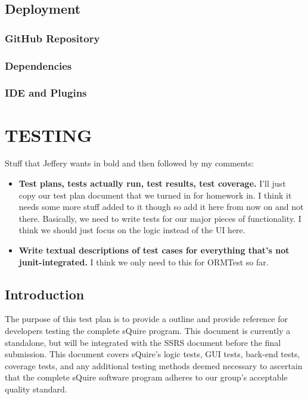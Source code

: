 \documentclass[twoside,letterpaper]{article}
\begin{document}
\newpage
\subsection{Deployment}

\subsubsection{GitHub Repository}



\newpage
\subsubsection{Dependencies}


\newpage
\subsubsection{IDE and Plugins}

\newpage
\section[Testing]{\rmfamily\bfseries\color{black} TESTING}


Stuff that Jeffery wants in bold and then followed by my comments:

\begin{itemize}
	\item \textbf{Test plans, tests actually run, test results, test coverage.} I'll just copy our test plan document that we turned in for homework in. I think it needs some more stuff added to it though so add it here from now on and not there. Basically, we need to write tests for our major pieces of functionality. I think we should just focus on the logic instead of the UI here.
	\item \textbf{Write textual descriptions of test cases for everything that's not junit-integrated.} I think we only need to this for ORMTest so far.
\end{itemize}


\subsection{Introduction}

The purpose of this test plan is to provide a outline and provide reference for developers testing the complete sQuire program. This document is currently a standalone, but will be integrated with the SSRS document before the final submission. This document covers sQuire's logic tests, GUI tests, back-end tests, coverage tests, and any additional testing methods deemed necessary to ascertain that the complete sQuire software program adheres to our group's acceptable quality standard.
\end{document}
